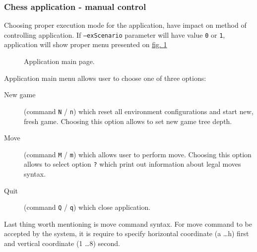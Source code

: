 \subsubsection{Chess application - manual control}
Choosing proper execution mode for the application, have impact on method of controlling application. If \texttt{--exScenario} parameter will have value \texttt{0} or \texttt{1}, application will show proper menu presented on \hyperref[fig:application-main-page]{fig. \ref*{fig:application-main-page}}
\begin{figure}
    \centering
    \caption{Application main page.}
    \label{fig:application-main-page}
\end{figure}
Application main menu allows user to choose one of three options:
\begin{description}
    \item[New game] (command \texttt{N} / \texttt{n}) which reset all environment configurations and start new, fresh game. Choosing this option allows to set new game tree depth.
    \item[Move] (command \texttt{M} / \texttt{m}) which allows user to perform move. Choosing this option allows to select option \texttt{?} which print out information about legal moves syntax.
    \item[Quit] (command \texttt{Q} / \texttt{q}) which close application.
\end{description}
Last thing worth mentioning is move command syntax. For move command to be accepted by the system, it is require to specify horizontal coordinate (a \dots h) first and vertical coordinate (1 \dots 8) second.
